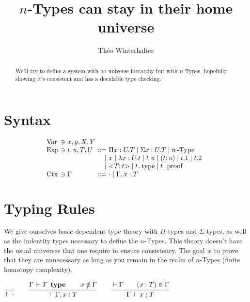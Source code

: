 \documentclass[a4paper,english]{lipics-utf8x}
\title{$n$-Types can stay in their home universe}
\author[1]{Théo Winterhalter}
\begin{document}
  \maketitle

  \begin{abstract}
    We'll try to define a system with no universe hierarchy but with
    $n$-Types, hopefully showing it's consistent and has a decidable type
    checking.
  \end{abstract}

  \section{Syntax}

  \[
    \begin{array}{l@{~}l@{~}l@{~}r@{~}l@{\quad}l}
      \Var  & \ni & x,y,X,Y \\
      \Exp  & \ni & t,u,T,U & ::= & \Pi x:U.T \mid \Sigma x:U.T \mid
                                    \nType{n} \\
                         &&& \mid & x \mid \lambda x:U.t \mid t~u
                               \mid (t;u) \mid t.1 \mid t.2 \\
                         &&& \mid & {<} T ; t {>}
                               \mid t \gettype \mid t \getproof \\
      \Ctx  & \ni & \Gamma  & ::= & \cdot \mid \Gamma, x:T \\
    \end{array}
  \]

  \section{Typing Rules}

  We give ourselves basic dependent type theory with $\Pi$-types and
  $\Sigma$-types, as well as the indentity types necessary to define the
  $n$-Types.
  This theory doesn't have the usual universes that one require to ensure
  consistency. The goal is to prove that they are unnecessary as long as you
  remain in the realm of $n$-Types (finite homotopy complexity).

  \begin{center}
  \(
    \ru{}{\der \cdot}
    \qquad
    \ru{\Gamma \der T \type \qquad
        x \notin \Gamma
      }{\der \Gamma, x : T}
    \qquad
    \ru{\der \Gamma \qquad
        (x : T) \in \Gamma
      }{\Gamma \der x : T}
  \)
  \end{center}
\end{document}
